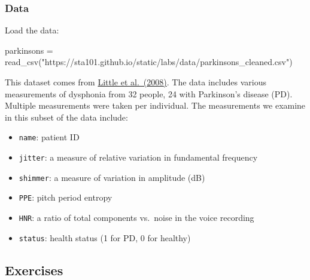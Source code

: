 \documentclass[
]{article}
\newenvironment{Shaded}{\begin{snugshade}}{\end{snugshade}}
\newcommand{\FunctionTok}[1]{\textcolor[rgb]{0.00,0.00,0.00}{#1}}
\newcommand{\NormalTok}[1]{#1}
\newcommand{\OtherTok}[1]{\textcolor[rgb]{0.56,0.35,0.01}{#1}}
\newcommand{\StringTok}[1]{\textcolor[rgb]{0.31,0.60,0.02}{#1}}
\providecommand{\tightlist}{%
  \setlength{\itemsep}{0pt}\setlength{\parskip}{0pt}}
\begin{document}
\hypertarget{data}{%
\subsubsection{Data}\label{data}}

Load the data:

\begin{Shaded}
\begin{Highlighting}[]
\NormalTok{parkinsons }\OtherTok{=} \FunctionTok{read\_csv}\NormalTok{(}\StringTok{"https://sta101.github.io/static/labs/data/parkinsons\_cleaned.csv"}\NormalTok{)}
\end{Highlighting}
\end{Shaded}

This dataset comes from
\href{https://www.ncbi.nlm.nih.gov/pmc/articles/PMC3051371/}{Little et
al.~(2008)}. The data includes various measurements of dysphonia from 32
people, 24 with Parkinson's disease (PD). Multiple measurements were
taken per individual. The measurements we examine in this subset of the
data include:

\begin{itemize}
\tightlist
\item
  \texttt{name}: patient ID
\item
  \texttt{jitter}: a measure of relative variation in fundamental
  frequency
\item
  \texttt{shimmer}: a measure of variation in amplitude (dB)
\item
  \texttt{PPE}: pitch period entropy
\item
  \texttt{HNR}: a ratio of total components vs.~noise in the voice
  recording
\item
  \texttt{status}: health status (1 for PD, 0 for healthy)
\end{itemize}

\hypertarget{exercises}{%
\subsection{Exercises}\label{exercises}}
\end{document}
